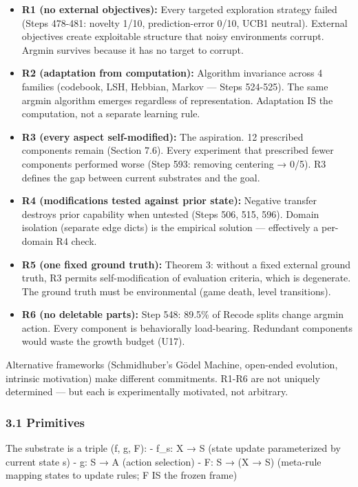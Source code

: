 \documentclass[
  11pt,
]{article}
\providecommand{\tightlist}{%
  \setlength{\itemsep}{0pt}\setlength{\parskip}{0pt}}
\begin{document}
\begin{itemize}
\tightlist
\item
  \textbf{R1 (no external objectives):} Every targeted exploration
  strategy failed (Steps 478-481: novelty 1/10, prediction-error 0/10,
  UCB1 neutral). External objectives create exploitable structure that
  noisy environments corrupt. Argmin survives because it has no target
  to corrupt.
\item
  \textbf{R2 (adaptation from computation):} Algorithm invariance across
  4 families (codebook, LSH, Hebbian, Markov --- Steps 524-525). The
  same argmin algorithm emerges regardless of representation. Adaptation
  IS the computation, not a separate learning rule.
\item
  \textbf{R3 (every aspect self-modified):} The aspiration. 12
  prescribed components remain (Section 7.6). Every experiment that
  prescribed fewer components performed worse (Step 593: removing
  centering → 0/5). R3 defines the gap between current substrates and
  the goal.
\item
  \textbf{R4 (modifications tested against prior state):} Negative
  transfer destroys prior capability when untested (Steps 506, 515,
  596). Domain isolation (separate edge dicts) is the empirical solution
  --- effectively a per-domain R4 check.
\item
  \textbf{R5 (one fixed ground truth):} Theorem 3: without a fixed
  external ground truth, R3 permits self-modification of evaluation
  criteria, which is degenerate. The ground truth must be environmental
  (game death, level transitions).
\item
  \textbf{R6 (no deletable parts):} Step 548: 89.5\% of Recode splits
  change argmin action. Every component is behaviorally load-bearing.
  Redundant components would waste the growth budget (U17).
\end{itemize}

Alternative frameworks (Schmidhuber's Gödel Machine, open-ended
evolution, intrinsic motivation) make different commitments. R1-R6 are
not uniquely determined --- but each is experimentally motivated, not
arbitrary.

\subsubsection{3.1 Primitives}\label{primitives}

The substrate is a triple (f, g, F): - f\_s: X → S (state update
parameterized by current state s) - g: S → A (action selection) - F: S →
(X → S) (meta-rule mapping states to update rules; F IS the frozen
frame)
\end{document}
